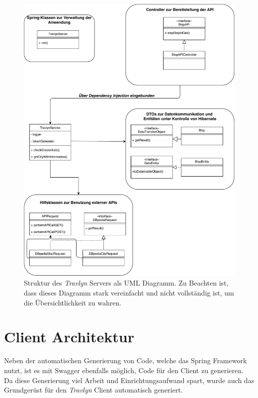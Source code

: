	
	\begin{figure}[ht!]
		\centering
		\includegraphics[width=1\textwidth]{images/UML_Diagram.pdf}
		\caption{Struktur des \textit{Travlyn} Servers als UML Diagramm. Zu Beachten ist, dass dieses Diagramm stark vereinfacht und nicht vollständig ist, um die Übersichtlichkeit zu wahren.}
		\label{fig:UML}
	\end{figure}

	\clearpage

	
	\section{Client Architektur} %
		
		Neben der automatischen Generierung von Code, welche das Spring Framework nutzt, ist es mit Swagger ebenfalls möglich, Code für den Client zu generieren. Da diese Generierung viel Arbeit und Einrichtungsaufwand spart, wurde auch das Grundgerüst für den \textit{Travlyn} Client automatisch generiert.
		
